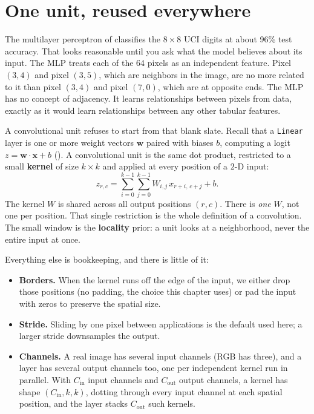 
\section{One unit, reused everywhere}\label{sec:conv-unit}

The multilayer perceptron of  classifies the $8 \times
8$ UCI digits at about 96\% test accuracy. That looks reasonable until you
ask what the model believes about its input. The MLP treats each of the 64
pixels as an independent feature. Pixel $(3, 4)$ and pixel $(3, 5)$, which
are neighbors in the image, are no more related to it than pixel $(3, 4)$
and pixel $(7, 0)$, which are at opposite ends. The MLP has no concept of
adjacency. It learns relationships between pixels from data, exactly as it
would learn relationships between any other tabular features.

A convolutional unit refuses to start from that blank slate. Recall that a
\texttt{Linear} layer is one or more weight vectors $\mathbf{w}$ paired with
biases $b$, computing a logit $z = \mathbf{w} \cdot \mathbf{x} + b$
(). A convolutional unit is the same dot product,
restricted to a small \textbf{kernel} of size $k \times k$ and applied at
every position of a $2$-D input:
\[
  z_{r, c} = \sum_{i=0}^{k-1} \sum_{j=0}^{k-1}
             W_{i, j}\, x_{r+i,\, c+j} + b.
\]
The kernel $W$ is shared across all output positions $(r, c)$. There is
\emph{one} $W$, not one per position. That single restriction is the whole
definition of a convolution. The small window is the \textbf{locality}
prior: a unit looks at a neighborhood, never the entire input at once.

Everything else is bookkeeping, and there is little of it:
\begin{itemize}
\item \textbf{Borders.} When the kernel runs off the edge of the input, we
  either drop those positions (no padding, the choice this chapter uses) or
  pad the input with zeros to preserve the spatial size.
\item \textbf{Stride.} Sliding by one pixel between applications is the
  default used here; a larger stride downsamples the output.
\item \textbf{Channels.} A real image has several input channels (RGB has
  three), and a layer has several output channels too, one per independent
  kernel run in parallel. With $C_{\text{in}}$ input channels and
  $C_{\text{out}}$ output channels, a kernel has shape $(C_{\text{in}}, k,
  k)$, dotting through every input channel at each spatial position, and the
  layer stacks $C_{\text{out}}$ such kernels.
\end{itemize}

